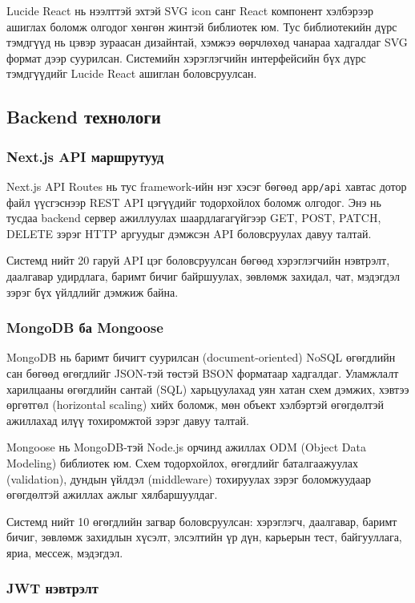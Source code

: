 Lucide React нь нээлттэй эхтэй SVG icon санг React компонент хэлбэрээр
ашиглах боломж олгодог хөнгөн жинтэй библиотек юм. Тус библиотекийн
дүрс тэмдгүүд нь цэвэр зураасан дизайнтай, хэмжээ өөрчлөхөд чанараа
хадгалдаг SVG формат дээр суурилсан. Системийн хэрэглэгчийн интерфейсийн
бүх дүрс тэмдгүүдийг Lucide React ашиглан боловсруулсан.

\subsection{Backend технологи}

\subsubsection{Next.js API маршрутууд}

Next.js API Routes нь тус framework-ийн нэг хэсэг бөгөөд
\texttt{app/api} хавтас дотор файл үүсгэснээр REST API цэгүүдийг
тодорхойлох боломж олгодог. Энэ нь тусдаа backend сервер ажиллуулах
шаардлагагүйгээр GET, POST, PATCH, DELETE зэрэг HTTP аргуудыг дэмжсэн
API боловсруулах давуу талтай.

Системд нийт 20 гаруй API цэг боловсруулсан бөгөөд хэрэглэгчийн
нэвтрэлт, даалгавар удирдлага, баримт бичиг байршуулах, зөвлөмж захидал,
чат, мэдэгдэл зэрэг бүх үйлдлийг дэмжиж байна.

\subsubsection{MongoDB ба Mongoose}

MongoDB нь баримт бичигт суурилсан (document-oriented) NoSQL өгөгдлийн
сан бөгөөд өгөгдлийг JSON-тэй төстэй BSON форматаар хадгалдаг.
Уламжлалт харилцааны өгөгдлийн сантай (SQL) харьцуулахад уян хатан
схем дэмжих, хэвтээ өргөтгөл (horizontal scaling) хийх боломж, мөн
объект хэлбэртэй өгөгдөлтэй ажиллахад илүү тохиромжтой зэрэг давуу
талтай.

Mongoose нь MongoDB-тэй Node.js орчинд ажиллах ODM (Object Data Modeling)
библиотек юм. Схем тодорхойлох, өгөгдлийг баталгаажуулах (validation),
дундын үйлдэл (middleware) тохируулах зэрэг боломжуудаар өгөгдөлтэй
ажиллах ажлыг хялбаршуулдаг.

Системд нийт 10 өгөгдлийн загвар боловсруулсан: хэрэглэгч, даалгавар,
баримт бичиг, зөвлөмж захидлын хүсэлт, элсэлтийн үр дүн, карьерын
тест, байгууллага, яриа, мессеж, мэдэгдэл.

\subsubsection{JWT нэвтрэлт}

